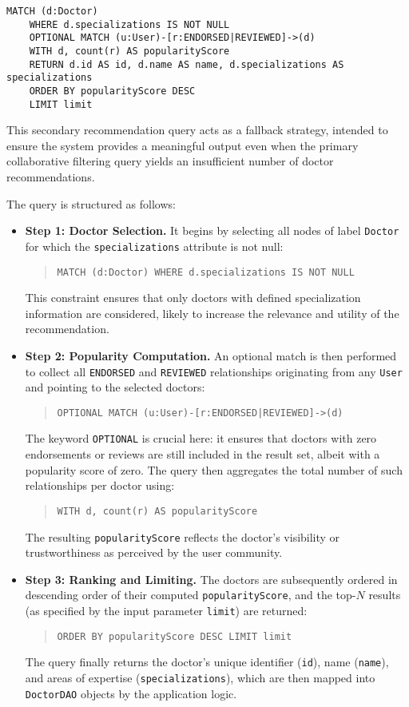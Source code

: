 \begin{lstlisting}[language=cypher]
	MATCH (d:Doctor)
	WHERE d.specializations IS NOT NULL
	OPTIONAL MATCH (u:User)-[r:ENDORSED|REVIEWED]->(d)
	WITH d, count(r) AS popularityScore
	RETURN d.id AS id, d.name AS name, d.specializations AS specializations
	ORDER BY popularityScore DESC
	LIMIT limit
\end{lstlisting}

This secondary recommendation query acts as a fallback strategy, intended to ensure the system provides a meaningful output even when the primary collaborative filtering query yields an insufficient number of doctor recommendations.

The query is structured as follows:
\begin{itemize}
	\item \textbf{Step 1: Doctor Selection.} It begins by selecting all nodes of label \texttt{Doctor} for which the \texttt{specializations} attribute is not null:
	\begin{quote}
		\texttt{MATCH (d:Doctor) WHERE d.specializations IS NOT NULL}
	\end{quote}
	This constraint ensures that only doctors with defined specialization information are considered, likely to increase the relevance and utility of the recommendation.
	
	\item \textbf{Step 2: Popularity Computation.} An optional match is then performed to collect all \texttt{ENDORSED} and \texttt{REVIEWED} relationships originating from any \texttt{User} and pointing to the selected doctors:
	\begin{quote}
		\texttt{OPTIONAL MATCH (u:User)-[r:ENDORSED|REVIEWED]->(d)}
	\end{quote}
	The keyword \texttt{OPTIONAL} is crucial here: it ensures that doctors with zero endorsements or reviews are still included in the result set, albeit with a popularity score of zero. The query then aggregates the total number of such relationships per doctor using:
	\begin{quote}
		\texttt{WITH d, count(r) AS popularityScore}
	\end{quote}
	The resulting \texttt{popularityScore} reflects the doctor's visibility or trustworthiness as perceived by the user community.
	
	\item \textbf{Step 3: Ranking and Limiting.} The doctors are subsequently ordered in descending order of their computed \texttt{popularityScore}, and the top-$N$ results (as specified by the input parameter \texttt{limit}) are returned:
	\begin{quote}
		\texttt{ORDER BY popularityScore DESC LIMIT limit}
	\end{quote}
	The query finally returns the doctor's unique identifier (\texttt{id}), name (\texttt{name}), and areas of expertise (\texttt{specializations}), which are then mapped into \texttt{DoctorDAO} objects by the application logic.
\end{itemize}

